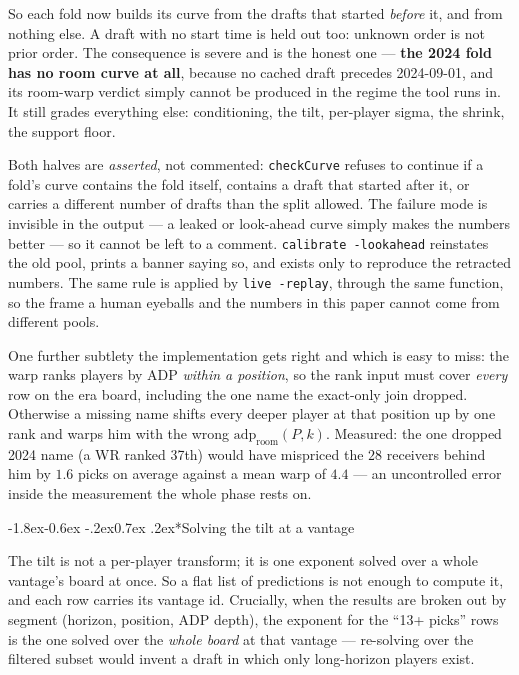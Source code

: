 \documentclass[10pt,a4paper]{article}
\makeatletter
\theoremstyle{plain}
\theoremstyle{definition}
\theoremstyle{remark}
\newcommand{\code}[1]{\texttt{\small #1}}
\newcommand{\adp}{\mathrm{adp}}
\renewcommand\subsubsection{\@startsection{subsubsection}{3}{\z@}%
  {-1.8ex\@plus -0.6ex \@minus -.2ex}{0.7ex \@plus .2ex}{\normalfont\normalsize\bfseries}}
\makeatother
\begin{document}
So each fold now builds its curve from the drafts that started \emph{before} it, and from
nothing else. A draft with no start time is held out too: unknown order is not prior order.
The consequence is severe and is the honest one --- \textbf{the 2024 fold has no room curve
at all}, because no cached draft precedes 2024-09-01, and its room-warp verdict simply
cannot be produced in the regime the tool runs in. It still grades everything else:
conditioning, the tilt, per-player sigma, the shrink, the support floor.

Both halves are \emph{asserted}, not commented: \code{checkCurve} refuses to continue if a
fold's curve contains the fold itself, contains a draft that started after it, or carries a
different number of drafts than the split allowed. The failure mode is invisible in the
output --- a leaked or look-ahead curve simply makes the numbers better --- so it cannot be
left to a comment. \code{calibrate -lookahead} reinstates the old pool, prints a banner
saying so, and exists only to reproduce the retracted numbers. The same rule is applied by
\code{live -replay}, through the same function, so the frame a human eyeballs and the
numbers in this paper cannot come from different pools.

One further subtlety the implementation gets right and which is easy to miss: the warp
ranks players by ADP \emph{within a position}, so the rank input must cover \emph{every}
row on the era board, including the one name the exact-only join dropped. Otherwise a
missing name shifts every deeper player at that position up by one rank and warps him
with the wrong $\adp_{\text{room}}(P,k)$. Measured: the one dropped 2024 name
(a WR ranked 37th) would have mispriced the $28$ receivers behind him by $1.6$ picks on
average against a mean warp of $4.4$ --- an uncontrolled error inside the measurement the
whole phase rests on.

\subsubsection*{Solving the tilt at a vantage}

The tilt is not a per-player transform; it is one exponent solved over a whole vantage's
board at once. So a flat list of predictions is not enough to compute it, and each row
carries its vantage id. Crucially, when the results are broken out by segment (horizon,
position, ADP depth), the exponent for the ``13+ picks'' rows is the one solved over the
\emph{whole board} at that vantage --- re-solving over the filtered subset would invent a
draft in which only long-horizon players exist.
\end{document}
